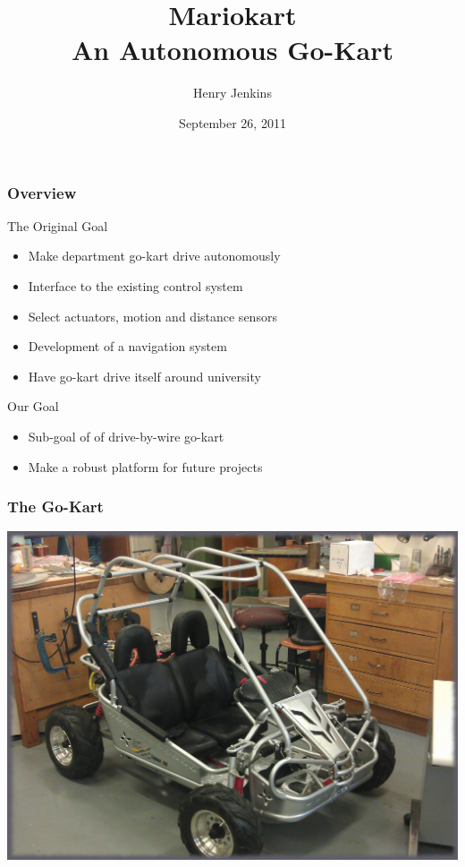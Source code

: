 \documentclass{beamer}
\begin{document}
\ECFAugie

\begin{frame}
\title{Mariokart \\ An Autonomous Go-Kart}
\author{Henry Jenkins}
\date{September 26, 2011}
\maketitle
\end{frame}

\begin{frame}
\frametitle{Overview}
The Original Goal
\begin{itemize}
\item Make department go-kart drive autonomously
\item Interface to the existing control system
\item Select actuators, motion and distance sensors
\item Development of a navigation system
\item Have go-kart drive itself around university
\end{itemize}

Our Goal
\begin{itemize}
\item Sub-goal of of drive-by-wire go-kart
\item Make a robust platform for future projects
\end{itemize}
\end{frame}

\begin{frame}
\frametitle{The Go-Kart}
    \begin{center}
      \includegraphics[width=.90\textwidth]{Images/kart.jpg}
    \end{center}
\end{frame}
\end{document}
